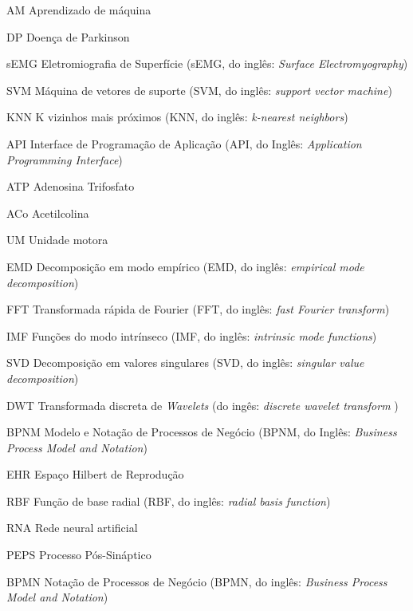 \begin{siglas}
  \item[AM] Aprendizado de máquina
  \item[DP] Doença de Parkinson
  \item[sEMG] Eletromiografia de Superfície (sEMG, do inglês: \textit{Surface Electromyography})
  \item[SVM] Máquina de vetores de suporte (SVM, do inglês: \textit{support vector machine}) 
  \item[KNN] K vizinhos mais próximos (KNN, do inglês: \textit{k-nearest neighbors}) 
  \item[API] Interface de Programação de Aplicação (API, do Inglês: \textit{Application Programming Interface})
  \item[ATP] Adenosina Trifosfato
  \item[ACo] Acetilcolina
  \item[UM] Unidade motora
  \item[EMD] Decomposição em modo empírico (EMD, do inglês: \textit{empirical mode decomposition})
  \item[FFT] Transformada rápida de Fourier (FFT, do inglês: \textit{fast Fourier transform}) 
  \item[IMF] Funções do modo intrínseco (IMF, do inglês: \textit{intrinsic mode functions})
  \item[SVD] Decomposição em valores singulares (SVD, do inglês: \textit{singular value decomposition})
  \item[DWT] Transformada discreta de \textit{Wavelets} (do ingês: \textit{discrete wavelet transform })
  \item[BPNM] Modelo e Notação de Processos de Negócio (BPNM, do Inglês: \textit{Business Process Model and Notation})
  \item[EHR] Espaço Hilbert de Reprodução
  \item[RBF] Função de base radial (RBF, do inglês: \textit{radial basis function})
  \item[RNA] Rede neural artificial
  \item[PEPS] Processo Pós-Sináptico
  \item[BPMN] Notação de Processos de Negócio (BPMN, do inglês: \textit{Business Process Model and Notation})
\end{siglas}

